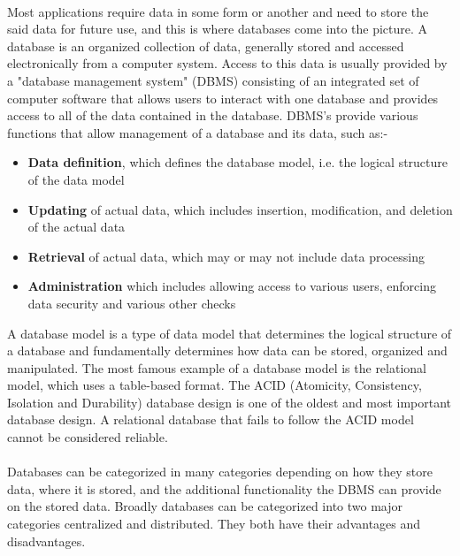 \documentclass{article}
\begin{document}
        \paragraph{}
        Most applications require data in some form or another and need to store the said data for future use, and this is where databases come into the picture.
        A database is an organized collection of data, generally stored and accessed electronically from a computer system.
        Access to this data is usually provided by a "database management system" (DBMS) consisting of an integrated set of computer software that allows users to interact with one database and provides access to all of the data contained in the database.
        DBMS's provide various functions that allow management of a database and its data, such as:-
        \begin{itemize}
            \item \textbf{Data definition}, which defines the database model, i.e. the logical structure of the data model
            \item \textbf{Updating} of actual data, which includes insertion, modification, and deletion of the actual data
            \item \textbf{Retrieval} of actual data, which may or may not include data processing
            \item \textbf{Administration} which includes allowing access to various users, enforcing data security and various other checks
        \end{itemize}
        A database model is a type of data model that determines the logical structure of a database and fundamentally determines how data can be stored, organized and manipulated. The most famous example of a database model is the relational model, which uses a table-based format. The ACID (Atomicity, Consistency, Isolation and Durability) database design is one of the oldest and most important database design. A relational database that fails to follow the ACID model cannot be considered reliable. 
        \paragraph{}
        Databases can be categorized in many categories depending on how they store data, where it is stored, and the additional functionality the DBMS can provide on the stored data. Broadly databases can be categorized into two major categories centralized and distributed. They both have their advantages and disadvantages.
\end{document}
